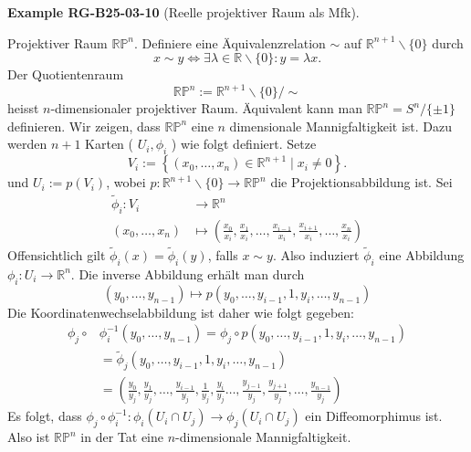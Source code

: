 \documentclass[10pt, letterpaper]{article}
\newcommand{\CustomHeading}[3]{%
  \par\medskip\noindent%
  \textbf{#1 #2} \textnormal{(#3)}.\enskip%
}
\newenvironment{EXA}[2]{\begin{unitbox}\CustomHeading{Example}{#1}{#2}}{\end{unitbox}}
\begin{document}
\begin{EXA}{RG-B25-03-10}{Reelle projektiver Raum als Mfk}
Projektiver Raum $\mathbb{R P}^{n}$. Definiere eine Äquivalenzrelation $\sim$ auf $\mathbb{R}^{n+1} \backslash\{0\}$ durch
$$
x \sim y \Longleftrightarrow \exists \lambda \in \mathbb{R} \backslash\{0\}: y=\lambda x .
$$
Der Quotientenraum
$$
\mathbb{R P}^{n}:=\mathbb{R}^{n+1} \backslash\{0\} / \sim
$$
heisst $n$-dimensionaler projektiver Raum. Äquivalent kann man $\mathbb{R} \mathbb{P}^{n}=S^{n} /\{ \pm 1\}$ definieren. Wir zeigen, dass $\mathbb{R} \mathbb{P}^{n}$ eine $n$ dimensionale Mannigfaltigkeit ist. Dazu werden $n+1$ Karten ( $U_{i}, \phi_{i}$ ) wie folgt definiert. Setze
$$
V_{i}:=\left\{\left(x_{0}, \ldots, x_{n}\right) \in \mathbb{R}^{n+1} \mid x_{i} \neq 0\right\} .
$$
und $U_{i}:=p\left(V_{i}\right)$, wobei $p: \mathbb{R}^{n+1} \backslash\{0\} \rightarrow \mathbb{R} \mathbb{P}^{n}$ die Projektionsabbildung ist. Sei
$$
\begin{aligned}
\tilde{\phi}_{i}: V_{i} & \rightarrow \mathbb{R}^{n} \\
\left(x_{0}, \ldots, x_{n}\right) & \mapsto\left(\frac{x_{0}}{x_{i}}, \frac{x_{1}}{x_{i}}, \ldots, \frac{x_{i-1}}{x_{i}}, \frac{x_{i+1}}{x_{i}}, \ldots, \frac{x_{n}}{x_{i}}\right)
\end{aligned}
$$
Offensichtlich gilt $\tilde{\phi}_{i}(x)=\tilde{\phi}_{i}(y)$, falls $x \sim y$. Also induziert $\tilde{\phi}_{i}$ eine Abbildung $\phi_{i}: U_{i} \rightarrow \mathbb{R}^{n}$. Die inverse Abbildung erhält man durch
$$
\left(y_{0}, \ldots, y_{n-1}\right) \mapsto p\left(y_{0}, \ldots, y_{i-1}, 1, y_{i}, \ldots, y_{n-1}\right)
$$
Die Koordinatenwechselabbildung ist daher wie folgt gegeben:
$$
\begin{aligned}
\phi_{j} \circ & \phi_{i}^{-1}\left(y_{0}, \ldots, y_{n-1}\right)=\phi_{j} \circ p\left(y_{0}, \ldots, y_{i-1}, 1, y_{i}, \ldots, y_{n-1}\right) \\
& =\tilde{\phi}_{j}\left(y_{0}, \ldots, y_{i-1}, 1, y_{i}, \ldots, y_{n-1}\right) \\
& =\left(\frac{y_{0}}{y_{j}}, \frac{y_{1}}{y_{j}}, \ldots, \frac{y_{i-1}}{y_{j}}, \frac{1}{y_{j}}, \frac{y_{i}}{y_{j}} \ldots, \frac{y_{j-1}}{y_{j}}, \frac{y_{j+1}}{y_{j}}, \ldots, \frac{y_{n-1}}{y_{j}}\right)
\end{aligned}
$$
Es folgt, dass $\phi_{j} \circ \phi_{i}^{-1}: \phi_{i}\left(U_{i} \cap U_{j}\right) \rightarrow \phi_{j}\left(U_{i} \cap U_{j}\right)$ ein Diffeomorphimus ist. Also ist $\mathbb{R P}^{n}$ in der Tat eine $n$-dimensionale Mannigfaltigkeit.
\end{EXA}
\end{document}
